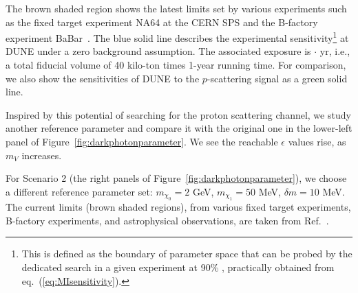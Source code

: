 The brown shaded region shows the latest limits set by various experiments such as the fixed target experiment NA64 at the CERN SPS and the B-factory experiment BaBar~\cite{Banerjee:2017hhz}.
The blue solid line describes the experimental sensitivity\footnote{This is defined as the boundary of parameter space that can be probed by the dedicated search in a given experiment at 90\% , practically obtained from eq.~(\ref{eq:MIsensitivity}).} at DUNE  under a zero background assumption.
The associated exposure is \fdfiducialmass $\cdot$ yr, i.e., a total fiducial volume of 40 kilo-ton times 1-year running time.
For comparison, we also show the sensitivities of DUNE to the $p$-scattering signal as a green solid line. 

Inspired by this potential of searching for the proton scattering channel, we study another reference parameter and compare it with the original one in the lower-left panel of Figure~\ref{fig:darkphotonparameter}. 
We see the reachable $\epsilon$ values rise, as $m_V$ increases. 


For Scenario 2 (the right panels of Figure~\ref{fig:darkphotonparameter}), we choose a different reference parameter set: $m_{\chi_0} = 2$ GeV, $m_{\chi_1} = 50$ MeV, $\delta m = 10$ MeV. 
The current limits (brown shaded regions), from various fixed target experiments, B-factory experiments, and astrophysical observations, are taken from Ref.~\cite{Banerjee:2018vgk}.



